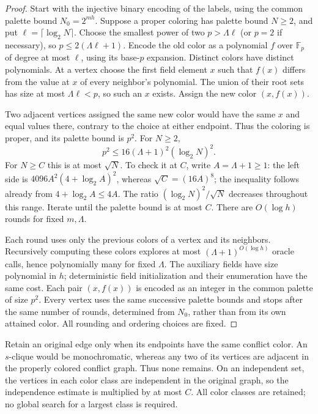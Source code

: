 \documentclass[11pt,a4paper]{article}
\newcommand{\F}{\mathbb F}
\theoremstyle{definition}
\theoremstyle{remark}
\numberwithin{equation}{section}
\begin{document}
\begin{proof}
Start with the injective binary encoding of the labels, using the common palette bound $N_0=2^{mh}$. Suppose a proper coloring has palette bound $N\ge2$, and put $\ell=\lceil\log_2N\rceil$. Choose the smallest power of two $p>\Lambda\ell$ (or $p=2$ if necessary), so $p\le2(\Lambda\ell+1)$. Encode the old color as a polynomial $f$ over $\F_p$ of degree at most $\ell$, using its base-$p$ expansion. Distinct colors have distinct polynomials. At a vertex choose the first field element $x$ such that $f(x)$ differs from the value at $x$ of every neighbor's polynomial. The union of their root sets has size at most $\Lambda\ell<p$, so such an $x$ exists. Assign the new color $(x,f(x))$.

Two adjacent vertices assigned the same new color would have the same $x$ and equal values there, contrary to the choice at either endpoint. Thus the coloring is proper, and its palette bound is $p^2$. For $N\ge2$,
\[
p^2\le16(\Lambda+1)^2(\log_2N)^2.
\]
For $N\ge C$ this is at most $\sqrt N$. To check it at $C$, write $A=\Lambda+1\ge1$: the left side is $4096A^2(4+\log_2A)^2$, whereas $\sqrt C=(16A)^8$; the inequality follows already from $4+\log_2A\le4A$. The ratio $(\log_2N)^2/\sqrt N$ decreases throughout this range. Iterate until the palette bound is at most $C$. There are $O(\log h)$ rounds for fixed $m,\Lambda$.

Each round uses only the previous colors of a vertex and its neighbors. Recursively computing these colors explores at most $(\Lambda+1)^{O(\log h)}$ oracle calls, hence polynomially many for fixed $\Lambda$. The auxiliary fields have size polynomial in $h$; deterministic field initialization and their enumeration have the same cost. Each pair $(x,f(x))$ is encoded as an integer in the common palette of size $p^2$. Every vertex uses the same successive palette bounds and stops after the same number of rounds, determined from $N_0$, rather than from its own attained color. All rounding and ordering choices are fixed.
\end{proof}

Retain an original edge only when its endpoints have the same conflict color. An $s$-clique would be monochromatic, whereas any two of its vertices are adjacent in the properly colored conflict graph. Thus none remains. On an independent set, the vertices in each color class are independent in the original graph, so the independence estimate is multiplied by at most $C$. All color classes are retained; no global search for a largest class is required.
\end{document}
